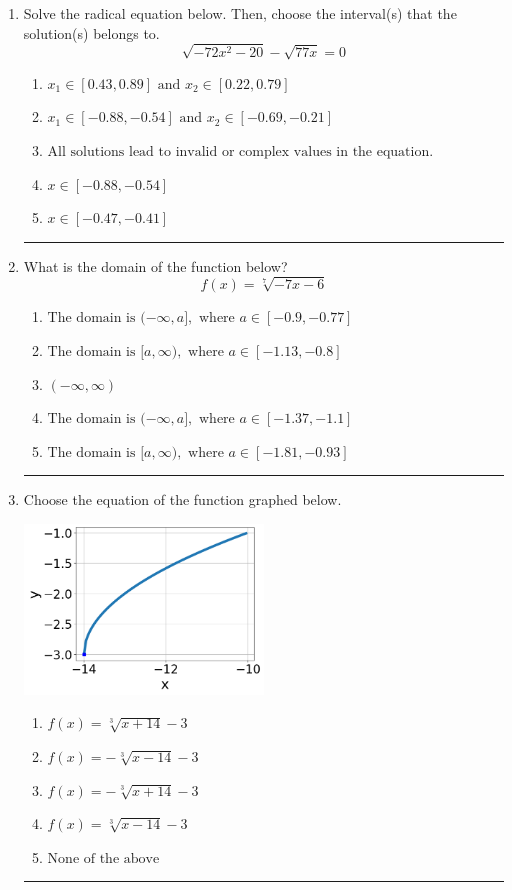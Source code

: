 \documentclass[14pt]{extbook}
\newcommand{\litem}[1]{\item#1\hspace*{-1cm}\rule{\textwidth}{0.4pt}}
\begin{document}
\begin{enumerate}
\litem{
Solve the radical equation below. Then, choose the interval(s) that the solution(s) belongs to.\[ \sqrt{-72 x^2 - 20} - \sqrt{77 x} = 0 \]\begin{enumerate}[label=\Alph*.]
\item \( x_1 \in [0.43, 0.89] \text{ and } x_2 \in [0.22,0.79] \)
\item \( x_1 \in [-0.88, -0.54] \text{ and } x_2 \in [-0.69,-0.21] \)
\item \( \text{All solutions lead to invalid or complex values in the equation.} \)
\item \( x \in [-0.88,-0.54] \)
\item \( x \in [-0.47,-0.41] \)

\end{enumerate} }
\litem{
What is the domain of the function below?\[ f(x) = \sqrt[7]{-7 x - 6} \]\begin{enumerate}[label=\Alph*.]
\item \( \text{The domain is } (-\infty, a], \text{   where } a \in [-0.9, -0.77] \)
\item \( \text{The domain is } [a, \infty), \text{   where } a \in [-1.13, -0.8] \)
\item \( (-\infty, \infty) \)
\item \( \text{The domain is } (-\infty, a], \text{   where } a \in [-1.37, -1.1] \)
\item \( \text{The domain is } [a, \infty), \text{   where } a \in [-1.81, -0.93] \)

\end{enumerate} }
\litem{
Choose the equation of the function graphed below.
\begin{center}
    \includegraphics[width=0.5\textwidth]{../Figures/radicalGraphToEquationA.png}
\end{center}
\begin{enumerate}[label=\Alph*.]
\item \( f(x) = \sqrt[3]{x + 14} - 3 \)
\item \( f(x) = - \sqrt[3]{x - 14} - 3 \)
\item \( f(x) = - \sqrt[3]{x + 14} - 3 \)
\item \( f(x) = \sqrt[3]{x - 14} - 3 \)
\item \( \text{None of the above} \)


\end{enumerate}}
\end{enumerate}
\end{document}
